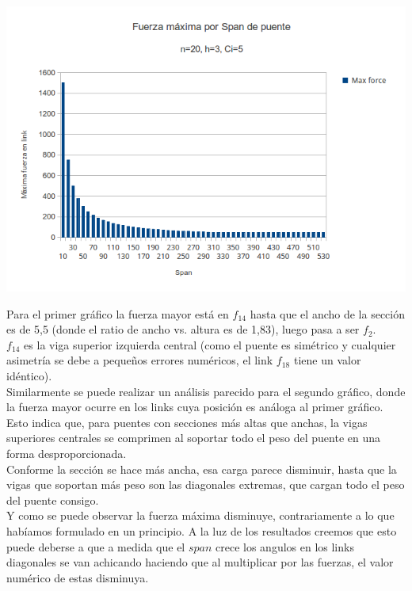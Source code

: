 \begin{center}
\includegraphics[scale=0.8]{archivos/graficos/Fuerza-x-span2.png}\\
\end{center}

Para el primer gráfico la fuerza mayor está en $f_{14}$ hasta que el ancho de la sección es de 5,5 (donde el ratio de ancho vs. altura es de 1,83), luego pasa a ser $f_2$.\\

$f_{14}$ es la viga superior izquierda central (como el puente es simétrico y cualquier asimetría se debe a pequeños errores numéricos, el link $f_{18}$ tiene un valor idéntico).\\

Similarmente se puede realizar un análisis parecido para el segundo gráfico, donde la fuerza mayor ocurre en los links cuya posición es análoga al primer gráfico.\\

Esto indica que, para puentes con secciones más altas que anchas, la vigas superiores centrales se comprimen al soportar todo el peso del puente en una forma desproporcionada.\\

Conforme la sección se hace más ancha, esa carga parece disminuir, hasta que la vigas que soportan más peso son las diagonales extremas, que cargan todo el peso del puente consigo.\\

Y como se puede observar la fuerza máxima disminuye, contrariamente a lo que habíamos formulado en un principio. A la luz de los resultados creemos que esto puede deberse a que a medida que el $span$ crece los angulos en los links diagonales se van achicando haciendo que al multiplicar por las fuerzas, el valor numérico de estas disminuya.

